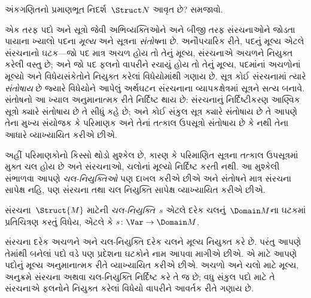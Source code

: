 \begin{prob}
અંકગણિતનો પ્રમાણભૂત નિદર્શ~$\Struct N$ આવૃત છે? સમજાવો.
\end{prob}
\endgroup


\begingroup
\makeatletter{}\makeatother


\label{guunit:OLP-0163}


\begin{explain}
એક તરફ પદો અને સૂત્રો જેવી અભિવ્યક્તિઓને અને બીજી તરફ
સંરચનાઓને જોડતા પાયાના ખ્યાલો પદના \emph{મૂલ્ય} અને
સૂત્રના \emph{સંતોષ}ના છે. અનૌપચારિક રીતે, પદનું મૂલ્ય
એટલે સંરચનાનો ઘટક---જો પદ માત્ર અચળ હોય તો તેનું
મૂલ્ય, સંરચનાએ અચળને નિયુક્ત કરેલી વસ્તુ છે; અને જો પદ
ફલનો વાપરીને રચાયું હોય તો તેનું મૂલ્ય, પદમાંનાં અચળોનાં
મૂલ્યો અને વિધેયસંકેતોને નિયુક્ત કરેલાં વિધેયોમાંથી ગણાય છે.
સૂત્ર કોઈ સંરચનામાં ત્યારે \emph{સંતોષાય} છે જ્યારે
વિધેયોને આપેલું અર્થઘટન સંરચનાના વ્યાપકક્ષેત્રમાં સૂત્રને સત્ય
બનાવે. સંતોષનો આ ખ્યાલ અનુમાનાત્મક રીતે નિર્દિષ્ટ થાય છે:
સંરચનાનું નિર્દિષ્ટીકરણ આણ્વિક સૂત્રો ક્યારે સંતોષાય છે તે
સીધું કહે છે; અને કોઈ સંકુલ સૂત્ર ક્યારે સંતોષાય છે તે આપણે તેના
મુખ્ય સંયોજક કે પરિમાણક અને તેનાં તત્કાલ ઉપસૂત્રો સંતોષાય છે કે
નથી તેના આધારે વ્યાખ્યાયિત કરીએ છીએ.

અહીં પરિમાણકોનો કિસ્સો થોડો મુશ્કેલ છે, કારણ કે પરિમાણિત
સૂત્રના તત્કાલ ઉપસૂત્રમાં મુક્ત ચલ હોય છે અને
સંરચનાઓ, ચલોનાં મૂલ્યો નિર્દિષ્ટ કરતી નથી. આ
મુશ્કેલી સંભાળવા આપણે \emph{ચલ-નિયુક્તિઓ} પણ દાખલ કરીએ છીએ અને સંતોષને
માત્ર સંરચના સાપેક્ષ નહિ, પણ સંરચના તથા
ચલ નિયુક્તિ સાપેક્ષ વ્યાખ્યાયિત કરીએ છીએ.
\end{explain}

\begin{defn}[ચલ-નિયુક્તિ]
સંરચના~$\Struct{M}$ માટેની \emph{ચલ-નિયુક્તિ}~$s$ એટલે દરેક
ચલનું~$\Domain M$ના ઘટકમાં પ્રતિચિત્રણ કરતું વિધેય,
એટલે કે $s\colon \Var \to \Domain M$.
\end{defn}

\begin{explain}
સંરચના દરેક અચળને અને ચલ-નિયુક્તિ દરેક ચલને
મૂલ્ય નિયુક્ત કરે છે. પરંતુ આપણે તેમાંથી બનેલાં પદો વડે પણ
પ્રદેશના ઘટકોને નામ આપવા માગીએ છીએ. એ માટે આપણે પદોનું
મૂલ્ય અનુમાનાત્મક રીતે વ્યાખ્યાયિત કરીએ છીએ. અચળો અને
ચલો માટે મૂલ્ય, અનુક્રમે સંરચના અથવા ચલ-નિયુક્તિ નિર્દિષ્ટ કરે
તે જ છે; વધુ સંકુલ પદો માટે તે સંરચનાએ ફલનોને નિયુક્ત
કરેલાં વિધેયો વાપરીને આવર્તક રીતે ગણાય છે.
\end{explain}


